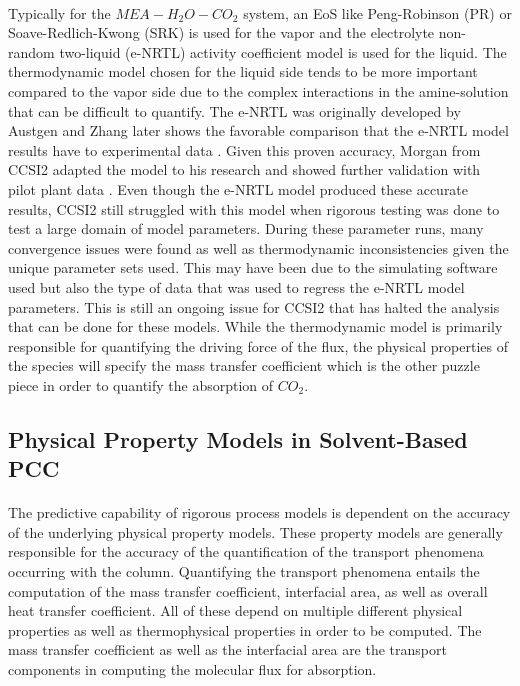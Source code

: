\documentclass[12pt, letterpaper]{article}
\begin{document}
\paragraph{}
Typically for the $MEA-H_2O-CO_2$ system, an EoS like Peng-Robinson (PR) or Soave-Redlich-Kwong (SRK) is used for the vapor and the electrolyte non-random two-liquid (e-NRTL) activity coefficient model is used for the liquid. The thermodynamic model chosen for the liquid side tends to be more important compared to the vapor side due to the complex interactions in the amine-solution that can be difficult to quantify. The e-NRTL was originally developed by Austgen\cite{Austgen1991} and Zhang later shows the favorable comparison that the e-NRTL model results have to experimental data \cite{Zhang2011}. Given this proven accuracy, Morgan from CCSI2 adapted the model to his research and showed further validation with pilot plant data \cite{Morgan2017_Dis}. Even though the e-NRTL model produced these accurate results, CCSI2 still struggled with this model when rigorous testing was done to test a large domain of model parameters.  During these parameter runs, many convergence issues were found as well as thermodynamic inconsistencies given the unique parameter sets used.  This may have been due to the simulating software used but also the type of data that was used to regress the e-NRTL model parameters. This is still an ongoing issue for CCSI2 that has halted the analysis that can be done for these models. While the thermodynamic model is primarily responsible for quantifying the driving force of the flux, the physical properties of the species will specify the mass transfer coefficient which is the other puzzle piece in order to quantify the absorption of $CO_2$. 

\subsection{Physical Property Models in Solvent-Based PCC}

\paragraph{}
The predictive capability of rigorous process models is dependent on the accuracy of the underlying physical property models. These property models are generally responsible for the accuracy of the quantification of the transport phenomena occurring with the column. Quantifying the transport phenomena entails the computation of the mass transfer coefficient, interfacial area, as well as overall heat transfer coefficient. All of these depend on multiple different physical properties as well as thermophysical properties in order to be computed. The mass transfer coefficient as well as the interfacial area are the transport components in computing the molecular flux for absorption.
\end{document}
